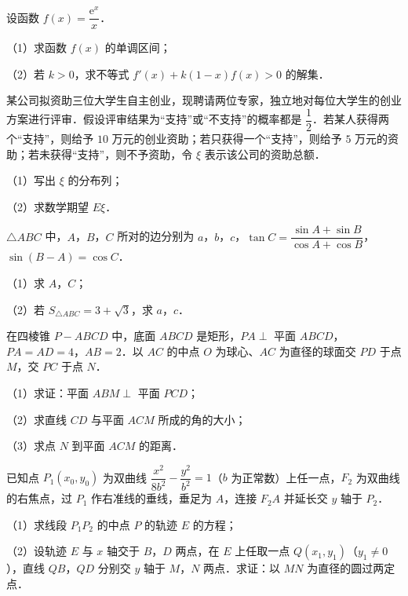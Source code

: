 \begin{question}
设函数 $f(x)=\dfrac{\mathrm e^x}{x}$．

（1）求函数 $f(x)$ 的单调区间；

（2）若 $k>0$，求不等式 $f'(x)+k(1-x)f(x)>0$ 的解集．

\end{question}
\begin{question}
某公司拟资助三位大学生自主创业，现聘请两位专家，独立地对每位大学生的创业方案进行评审．假设评审结果为“支持”或“不支持”的概率都是 $\dfrac12$．若某人获得两个“支持”，则给予 $10$ 万元的创业资助；若只获得一个“支持”，则给予 $5$ 万元的资助；若未获得“支持”，则不予资助，令 $\xi$ 表示该公司的资助总额．

（1）写出 $\xi$ 的分布列；

（2）求数学期望 $E\xi$．

\end{question}
\begin{question}
$\triangle ABC$ 中，$A$，$B$，$C$ 所对的边分别为 $a$，$b$，$c$，$\tan C=\dfrac{\sin A+\sin B}{\cos A+\cos B}$，$\sin(B-A)=\cos C$．

（1）求 $A$，$C$；

（2）若 $S_{\triangle ABC}=3+\sqrt3$，求 $a$，$c$．

\Needspace{0.4\textheight}
\end{question}
\begingroup
\renewenvironment{question}{\Needspace{0.5\textheight}}{}
\begin{question}
在四棱锥 $P-ABCD$ 中，底面 $ABCD$ 是矩形，$PA\perp$ 平面 $ABCD$，$PA=AD=4$，$AB=2$．以 $AC$ 的中点 $O$ 为球心、$AC$ 为直径的球面交 $PD$ 于点 $M$，交 $PC$ 于点 $N$．

（1）求证：平面 $ABM\perp$ 平面 $PCD$；

（2）求直线 $CD$ 与平面 $ACM$ 所成的角的大小；

（3）求点 $N$ 到平面 $ACM$ 的距离．
\nopagebreak[4]
\begin{center}\end{center}
\nopagebreak[4]
\Needspace{0.4\textheight}
\end{question}
\endgroup
\begingroup
\renewenvironment{question}{\Needspace{0.5\textheight}}{}
\begin{question}
已知点 $P_1(x_0,y_0)$ 为双曲线 $\dfrac{x^2}{8b^2}-\dfrac{y^2}{b^2}=1$（$b$ 为正常数）上任一点，$F_2$ 为双曲线的右焦点，过 $P_1$ 作右准线的垂线，垂足为 $A$，连接 $F_2A$ 并延长交 $y$ 轴于 $P_2$．

（1）求线段 $P_1P_2$ 的中点 $P$ 的轨迹 $E$ 的方程；

（2）设轨迹 $E$ 与 $x$ 轴交于 $B$，$D$ 两点，在 $E$ 上任取一点 $Q(x_1,y_1)$（$y_1\neq0$），直线 $QB$，$QD$ 分别交 $y$ 轴于 $M$，$N$ 两点．求证：以 $MN$ 为直径的圆过两定点．
\nopagebreak[4]
\begin{center}\end{center}
\nopagebreak[4]
\end{question}
